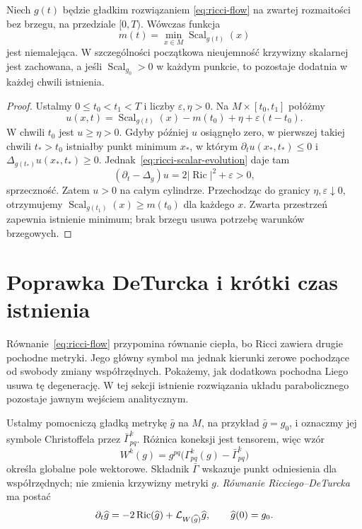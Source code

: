 \begin{twierdzenie}
\label{thm:ricci-scalar-max-principle}
Niech $g(t)$ będzie gładkim rozwiązaniem
\eqref{eq:ricci-flow} na zwartej rozmaitości bez brzegu,
na przedziale $[0,T)$. Wówczas funkcja
\[
 m(t)=\min_{x\in M}\operatorname{Scal}_{g(t)}(x)
\]
jest niemalejąca. W szczególności początkowa
nieujemność krzywizny skalarnej jest zachowana,
a jeśli $\operatorname{Scal}_{g_0}>0$ w każdym punkcie,
to pozostaje dodatnia w każdej chwili istnienia.
\end{twierdzenie}
\begin{proof}
Ustalmy $0\leq t_0<t_1<T$ i liczby $\varepsilon,\eta>0$.
Na $M\times[t_0,t_1]$ połóżmy
\[
 u(x,t)=\operatorname{Scal}_{g(t)}(x)
       -m(t_0)+\eta+\varepsilon(t-t_0).
\]
W chwili $t_0$ jest $u\geq\eta>0$.
Gdyby później $u$ osiągnęło zero, w pierwszej takiej
chwili $t_*>t_0$ istniałby punkt minimum $x_*$,
w którym $\partial_tu(x_*,t_*)\leq0$ i
$\Delta_{g(t_*)}u(x_*,t_*)\geq0$.
Jednak~\eqref{eq:ricci-scalar-evolution} daje tam
\[
 (\partial_t-\Delta_g)u
   =2|\operatorname{Ric}|^2+\varepsilon>0,
\]
sprzeczność. Zatem $u>0$ na całym cylindrze.
Przechodząc do granicy $\eta,\varepsilon\downarrow0$,
otrzymujemy
$\operatorname{Scal}_{g(t_1)}(x)\geq m(t_0)$
dla każdego $x$. Zwarta przestrzeń zapewnia
istnienie minimum; brak brzegu usuwa potrzebę
warunków brzegowych.
\end{proof}

\section{Poprawka DeTurcka i krótki czas istnienia}
\label{sec:ricci-deturck}

Równanie~\eqref{eq:ricci-flow} przypomina równanie
ciepła, bo Ricci zawiera drugie pochodne metryki.
Jego główny symbol ma jednak kierunki zerowe
pochodzące od swobody zmiany współrzędnych.
Pokażemy, jak dodatkowa pochodna Liego usuwa tę
degenerację. W tej sekcji istnienie rozwiązania
układu parabolicznego pozostaje jawnym wejściem
analitycznym.

Ustalmy pomocniczą gładką metrykę $\bar g$ na $M$,
na przykład $\bar g=g_0$, i oznaczmy jej symbole
Christoffela przez $\bar\Gamma^k_{pq}$. Różnica
koneksji jest tensorem, więc wzór
\begin{equation}\label{eq:ricci-deturck-vector}
 W^k(g)=g^{pq}\bigl(\Gamma^k_{pq}(g)
                            -\bar\Gamma^k_{pq}\bigr)
\end{equation}
określa globalne pole wektorowe. Składnik
$\bar\Gamma$ wskazuje punkt odniesienia dla
współrzędnych; nie zmienia krzywizny metryki $g$.
\emph{Równanie Ricciego--DeTurcka} ma postać
\begin{equation}\label{eq:ricci-deturck}
 \partial_t\widehat g
  =-2\operatorname{Ric}(\widehat g)
    +\mathcal L_{W(\widehat g)}\widehat g,
 \qquad \widehat g(0)=g_0.
\end{equation}

